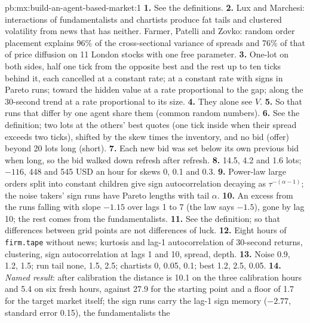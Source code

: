 \begin{solution}{pb:mx:build-an-agent-based-market:1}
\textbf{1.} See the definitions.
\textbf{2.} Lux and Marchesi: interactions of fundamentalists and chartists produce fat tails and clustered volatility from news that has neither.
Farmer, Patelli and Zovko: random order placement explains 96\% of the cross-sectional variance of spreads and 76\% of that of price diffusion on 11
London stocks with one free parameter.
\textbf{3.} One-lot  on both sides, half one tick from the opposite best and the rest up to ten ticks behind it, each cancelled at a
constant rate;  at a constant rate with signs in Pareto runs;  toward the hidden value at a rate proportional to the gap;
 along the 30-second trend at a rate proportional to its size.
\textbf{4.} They alone see $V$.
\textbf{5.} So that runs that differ by one agent share them (common random numbers).
\textbf{6.} See the definition; two lots at the others' best quotes (one tick inside when their spread exceeds two ticks), shifted by the skew times the
inventory, and no bid (offer) beyond 20 lots long (short).
\textbf{7.} Each new bid was set below its own previous bid when long, so the bid walked down refresh after refresh.
\textbf{8.} 14.5, 4.2 and 1.6 lots; $-116$, 448 and 545 USD an hour for skews 0, 0.1 and 0.3.
\textbf{9.} Power-law large orders split into constant children give sign autocorrelation decaying as $\tau^{-(\alpha-1)}$; the noise takers' sign runs
have Pareto lengths with tail $\alpha$.
\textbf{10.} An excess from the runs falling with slope $-1.15$ over lags 1 to 7 (the law says $-1.5$), gone by lag 10; the rest comes from the
fundamentalists.
\textbf{11.} See the definition; so that differences between grid points are not differences of luck.
\textbf{12.} Eight hours of \texttt{firm.tape} without news; kurtosis and lag-1 autocorrelation of 30-second returns, clustering, sign autocorrelation at
lags 1 and 10, spread, depth.
\textbf{13.} Noise 0.9, 1.2, 1.5; run tail none, 1.5, 2.5; chartists 0, 0.05, 0.1; best 1.2, 2.5, 0.05.
\textbf{14.} \emph{Named result}: after calibration the distance is 10.1 on the three calibration hours and 5.4 on six fresh hours, against 27.9 for
the starting point and a floor of 1.7 for the target market itself; the sign runs carry the lag-1 sign memory ($-2.77$, standard error 0.15), the fundamentalists the

\end{solution}
